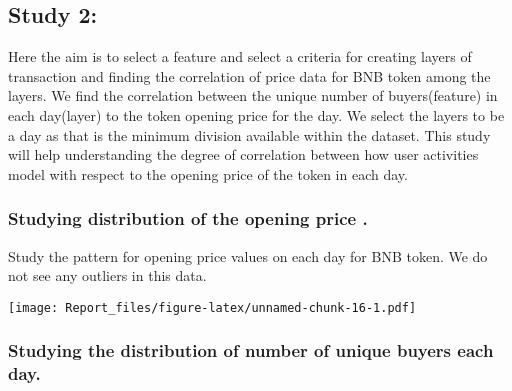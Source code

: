 \documentclass[]{article}
\newenvironment{Shaded}{\begin{snugshade}}{\end{snugshade}}
\newcommand{\KeywordTok}[1]{\textcolor[rgb]{0.13,0.29,0.53}{\textbf{#1}}}
\newcommand{\DataTypeTok}[1]{\textcolor[rgb]{0.13,0.29,0.53}{#1}}
\newcommand{\StringTok}[1]{\textcolor[rgb]{0.31,0.60,0.02}{#1}}
\newcommand{\CommentTok}[1]{\textcolor[rgb]{0.56,0.35,0.01}{\textit{#1}}}
\newcommand{\OperatorTok}[1]{\textcolor[rgb]{0.81,0.36,0.00}{\textbf{#1}}}
\newcommand{\NormalTok}[1]{#1}
\begin{document}
\subsection{Study 2:}\label{study-2}

Here the aim is to select a feature and select a criteria for creating
layers of transaction and finding the correlation of price data for BNB
token among the layers. We find the correlation between the unique
number of buyers(feature) in each day(layer) to the token opening price
for the day. We select the layers to be a day as that is the minimum
division available within the dataset. This study will help
understanding the degree of correlation between how user activities
model with respect to the opening price of the token in each day.

\subsubsection{Studying distribution of the opening price
.}\label{studying-distribution-of-the-opening-price-.}

Study the pattern for opening price values on each day for BNB token. We
do not see any outliers in this data.

\begin{Shaded}
\end{Shaded}

\texttt{[image: Report\_files/figure-latex/unnamed-chunk-16-1.pdf]}

\subsubsection{Studying the distribution of number of unique buyers each
day.}\label{studying-the-distribution-of-number-of-unique-buyers-each-day.}
\end{document}
